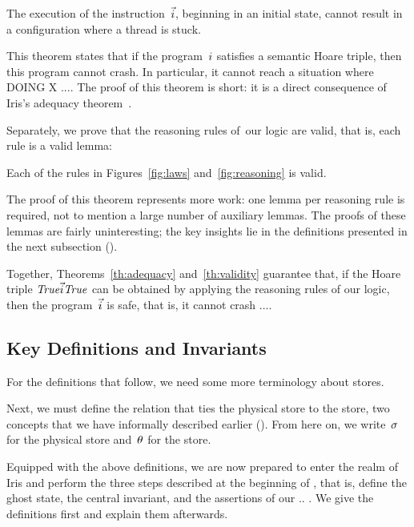 \begin{theorem}
\label{th:adequacy}
 The execution of the instruction~$\vec{i}$, beginning in an initial state, cannot result in a configuration where a thread is stuck.
\end{theorem}

This theorem states that if the program~$i$ satisfies a semantic Hoare
triple, then this program cannot crash. In
particular, it cannot reach a situation where DOING X ....
%
The proof of this theorem is short: it is a direct consequence of Iris's
adequacy theorem~\cite[\S6.4]{iris}.

Separately, we prove that the reasoning rules of~our logic are valid, that is,
each rule is a valid lemma:

\begin{theorem}
\label{th:validity}
  Each of the rules in Figures~\ref{fig:laws}
  and~\ref{fig:reasoning} is valid.
\end{theorem}

The proof of this theorem represents more work: one lemma per reasoning rule
is required, not to mention a large number of auxiliary lemmas. The proofs of
these lemmas are fairly uninteresting; the key insights lie in the definitions
presented in the next subsection ().

Together, Theorems~\ref{th:adequacy} and~\ref{th:validity} guarantee that, if
the Hoare triple $\mathit{True}\vec{i}\mathit{True}$ can be obtained by applying
the reasoning rules of our logic, then the program~$\vec{i}$ is safe, that is, it cannot crash ....

\subsection{Key Definitions and Invariants}
\label{sec:invariant}

For the definitions that follow, we need some more terminology about stores.

Next, we must define the relation that ties the physical store to the
\logical store, two concepts that we have informally described earlier
(). From here on, we write~$\sigma$ for the physical
store and~$\theta$ for the \logical store.

Equipped with the above definitions, we are now prepared to enter the realm of
Iris and perform the three steps described at the beginning of
, that is, define the ghost state, the central invariant,
and the assertions of our .. . We give the definitions first and explain them
afterwards.

